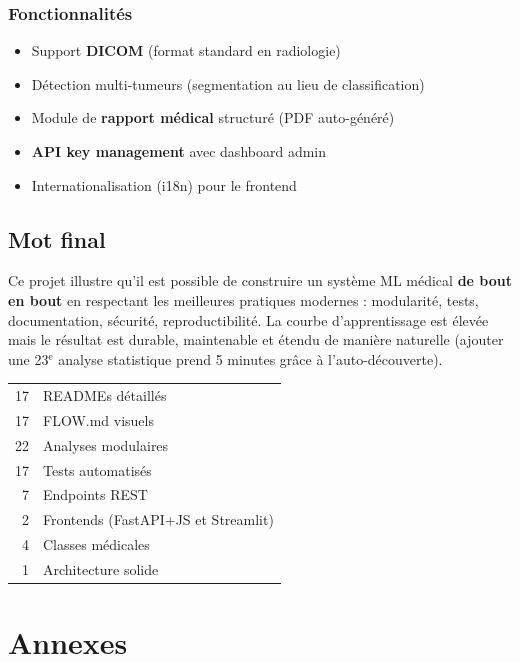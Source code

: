 \documentclass[11pt,a4paper,oneside]{report}
\begin{document}
\subsection{Fonctionnalités}

\begin{itemize}
\item Support \textbf{DICOM} (format standard en radiologie)
\item Détection multi-tumeurs (segmentation au lieu de classification)
\item Module de \textbf{rapport médical} structuré (PDF auto-généré)
\item \textbf{API key management} avec dashboard admin
\item Internationalisation (i18n) pour le frontend
\end{itemize}

\section{Mot final}

Ce projet illustre qu'il est possible de construire un système ML médical \textbf{de bout en bout} en respectant les meilleures pratiques modernes : modularité, tests, documentation, sécurité, reproductibilité. La courbe d'apprentissage est élevée mais le résultat est durable, maintenable et étendu de manière naturelle (ajouter une 23$^\text{e}$ analyse statistique prend 5 minutes grâce à l'auto-découverte).

\begin{successbox}
\centering
\begin{tabular}{rl}
17 & READMEs détaillés \\
17 & FLOW.md visuels \\
22 & Analyses modulaires \\
17 & Tests automatisés \\
7 & Endpoints REST \\
2 & Frontends (FastAPI+JS et Streamlit) \\
4 & Classes médicales \\
1 & Architecture solide
\end{tabular}
\end{successbox}

\appendix
\chapter{Annexes}
\end{document}
